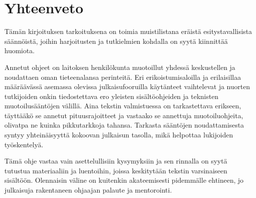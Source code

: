 \documentclass[finnish,gradu]{tktltiki}
\begin{document}
\section{Yhteenveto}

Tämän kirjoituksen tarkoituksena on toimia muistilistana eräistä
esitystavallisista säännöistä, joihin harjoitusten ja tutkielmien
kohdalla on syytä kiinnittää huomiota.

Annetut ohjeet on laitoksen henkilökunta muotoillut yhdessä keskustellen
ja noudattaen oman tieteenalansa perinteitä. Eri erikoistumisaloilla ja
erilaisillaa määräävässä asemassa olevissa julkaisufooruilla käytänteet
vaihtelevat ja nuorten tutkijoiden onkin tiedostettava ero yleisten
sisältöohjeiden ja teknisten muotoilusääntöjen välillä. Aina tekstin
valmistuessa on tarkastettava erikseen, täyttääkö se annetut
pituusrajoitteet ja vastaako se annettuja muotoiluohjeita, olivatpa ne
kuinka pikkutarkkoja tahansa. Tarkasta sääntöjen noudattamisesta syntyy
yhteinäisyyttä kokoovan julkaisun tasolla, mikä helpottaa lukijoiden
työskentelyä.

Tämä ohje vastaa vain asettelullisiin kysymyksiin ja sen rinnalla on
syytä tutustua materiaaliin ja luentoihin, joissa keskitytään tekstin
varsinaiseen sisältöön. Olennaisin väline on kuitenkin akateemisesti
pidemmälle ehtineen, jo julkaisuja rakentaneen ohjaajan palaute ja
mentorointi.


%


\nocite{*}






%
%
%



% 

\end{document}
